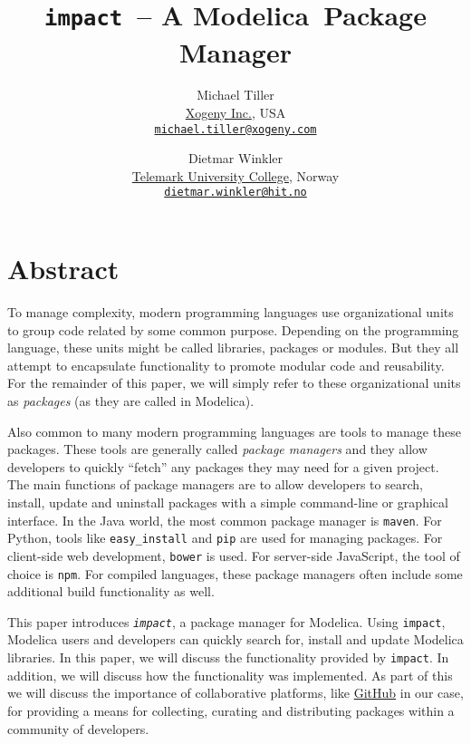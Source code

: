 \documentclass[11pt,a4paper,twocolumn]{article}
\newcommand{\myr}{\textsuperscript{\textregistered}}
\newcommand{\impact}{\texttt{impact}} %
\newcommand{\code}[1]{\texttt{#1}} %
\begin{document}
\title{\impact\ -- A Modelica\myr\ Package Manager}

\author{Michael Tiller\\
  \href{http://xogeny.com}{Xogeny Inc.}, USA\\
  \href{mailto:michael.tiller@xogeny.com}{\nolinkurl{michael.tiller@xogeny.com}} %
  \and Dietmar Winkler\\
  \href{http://www.hit.no}{Telemark University College}, Norway\\
  \href{mailto:dietmar.winkler@hit.no}{\nolinkurl{dietmar.winkler@hit.no}}}
\date{} %
\maketitle\thispagestyle{empty} %

\section*{Abstract}

To manage complexity, modern programming languages use organizational
units to group code related by some common purpose.  Depending on the
programming language, these units might be called libraries, packages
or modules.  But they all attempt to encapsulate functionality to
promote modular code and reusability.  For the remainder of this
paper, we will simply refer to these organizational units as
\emph{packages} (as they are called in Modelica).

Also common to many modern programming languages are tools to manage
these packages.  These tools are generally called \emph{package
  managers} and they allow developers to quickly ``fetch'' any
packages they may need for a given project.  The main functions of
package managers are to allow developers to search, install, update
and uninstall packages with a simple command-line or graphical
interface.  In the Java world, the most common package manager is
\code{maven}.  For Python, tools like
\code{easy\_install}\cite{easy_install} and \code{pip}\cite{pip} are
used for managing packages.  For client-side web development,
\code{bower} is used.  For server-side JavaScript, the tool of choice
is \code{npm}\cite{npm}.  For compiled languages, these package
managers often include some additional build functionality as well.

This paper introduces \emph{\impact}, a package manager for
Modelica. Using \impact, Modelica users and developers can quickly
search for, install and update Modelica libraries.  In this paper, we
will discuss the functionality provided by \impact.  In addition, we
will discuss how the functionality was implemented.  As part of this
we will discuss the importance of collaborative platforms, like
\href{https://github.com}{GitHub}\cite{github} in our case, for providing
a means for collecting, curating and distributing packages within a community
of developers.
\end{document}
